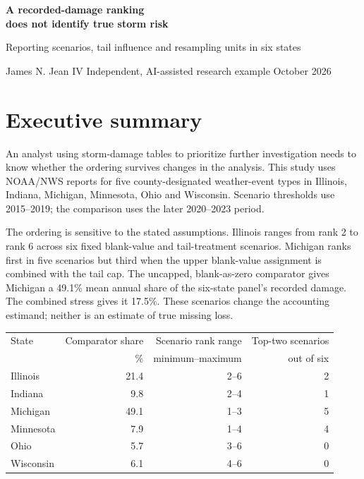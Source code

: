 \documentclass[11pt,letterpaper]{article}
\begin{document}
{\LARGE\bfseries A recorded-damage ranking\\does not identify true storm risk\par}
\vspace{8pt}
{\large Reporting scenarios, tail influence and resampling units in six states\par}
{\small James N. Jean IV \quad Independent, AI-assisted research example  October 2026\par}
\section*{Executive summary}
An analyst using storm-damage tables to prioritize further investigation needs to know whether the ordering survives changes in the analysis. This study uses NOAA/NWS reports for five county-designated weather-event types in Illinois, Indiana, Michigan, Minnesota, Ohio and Wisconsin. Scenario thresholds use 2015--2019; the comparison uses the later 2020--2023 period.

The ordering is sensitive to the stated assumptions. Illinois ranges from rank 2 to rank 6 across six fixed blank-value and tail-treatment scenarios. Michigan ranks first in five scenarios but third when the upper blank-value assignment is combined with the tail cap. The uncapped, blank-as-zero comparator gives Michigan a 49.1\% mean annual share of the six-state panel's recorded damage. The combined stress gives it 17.5\%. These scenarios change the accounting estimand; neither is an estimate of true missing loss.

\begin{center}\small
\begin{tabular}{lrrr}\toprule
State & Comparator share & Scenario rank range & Top-two scenarios\\
 & \% & minimum--maximum & out of six\\\midrule
Illinois & 21.4 & 2--6 & 2\\
Indiana & 9.8 & 2--4 & 1\\
Michigan & 49.1 & 1--3 & 5\\
Minnesota & 7.9 & 1--4 & 4\\
Ohio & 5.7 & 3--6 & 0\\
Wisconsin & 6.1 & 4--6 & 0\\\bottomrule
\end{tabular}
\end{center}
\end{document}
